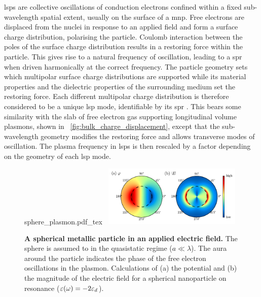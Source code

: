 \documentclass{article}
\begin{document}
\Glspl{lsp} are collective oscillations of conduction electrons confined within a fixed sub-wavelength spatial extent, usually on the surface of a \gls{mnp}. Free electrons are displaced from the nuclei in response to an applied field and form a surface charge distribution, polarising the particle. Coulomb interaction between the poles of the surface charge distribution results in a restoring force within the particle. This gives rise to a natural frequency of oscillation, leading to a \gls{spr} when driven harmonically at the correct frequency.
The particle geometry sets which multipolar surface charge distributions are supported while its material properties and the dielectric properties of the surrounding medium set the restoring force. Each different multipolar charge distribution is therefore considered to be a unique \gls{lsp} mode, identifiable by its \gls{spr} \cite{murray2007}.
This bears some similarity with the slab of free electron gas supporting longitudinal volume plasmons, shown in \figurename~\ref{fig:bulk_charge_displacement}, except that the sub-wavelength geometry modifies the restoring force and allows transverse modes of oscillation. The plasma frequency in \glspl{lsp} is then rescaled by a factor depending on the geometry of each \gls{lsp} mode. %

\begin{figure}[bt]
\centering
\fontsize{10pt}{1em}\selectfont
\def\svgwidth{0.35\textwidth}
{sphere_plasmon.pdf_tex}
~\includegraphics[width=0.59\textwidth]{figures/spherical_np_dipole_lsp}
\caption[A spherical metallic particle in an applied electric field]{\textbf{A spherical metallic particle in an applied electric field.} The sphere is assumed to in the quasistatic regime ($a\ll\lambda$). The aura around the particle indicates the phase of the free electron oscillations in the plasmon. Calculations of (a) the potential and (b) the magnitude of the electric field for a spherical nanoparticle on resonance ($\varepsilon(\omega)=-2\varepsilon_d$).}
\label{fig:sphere_plasmon}
\end{figure}
\end{document}
